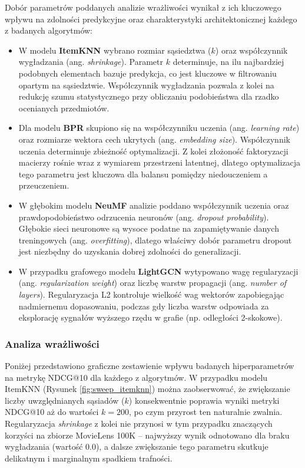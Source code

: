 Dobór parametrów poddanych analizie wrażliwości wynikał z ich kluczowego wpływu na zdolności predykcyjne oraz charakterystyki architektonicznej każdego z badanych algorytmów:
\begin{itemize}
    \item W modelu \textbf{ItemKNN} wybrano rozmiar sąsiedztwa ($k$) oraz współczynnik wygładzania (ang. \foreignlanguage{english}{\textit{shrinkage}}). Parametr $k$ determinuje, na ilu najbardziej podobnych elementach bazuje predykcja, co jest kluczowe w filtrowaniu opartym na sąsiedztwie. Współczynnik wygładzania pozwala z kolei na redukcję szumu statystycznego przy obliczaniu podobieństwa dla rzadko ocenianych przedmiotów.
    \item Dla modelu \textbf{BPR} skupiono się na współczynniku uczenia (ang. \foreignlanguage{english}{\textit{learning rate}}) oraz rozmiarze wektora cech ukrytych (ang. \foreignlanguage{english}{\textit{embedding size}}). Współczynnik uczenia determinuje zbieżność optymalizacji. Z kolei złożoność faktoryzacji macierzy rośnie wraz z wymiarem przestrzeni latentnej, dlatego optymalizacja tego parametru jest kluczowa dla balansu pomiędzy niedouczeniem a przeuczeniem.
    \item W głębokim modelu \textbf{NeuMF} analizie poddano współczynnik uczenia oraz prawdopodobieństwo odrzucenia neuronów (ang. \foreignlanguage{english}{\textit{dropout probability}}). Głębokie sieci neuronowe są wysoce podatne na zapamiętywanie danych treningowych (ang. \foreignlanguage{english}{\textit{overfitting}}), dlatego właściwy dobór parametru dropout jest niezbędny do uzyskania dobrej zdolności do generalizacji.
    \item W przypadku grafowego modelu \textbf{LightGCN} wytypowano wagę regularyzacji (ang. \foreignlanguage{english}{\textit{regularization weight}}) oraz liczbę warstw propagacji (ang. \foreignlanguage{english}{\textit{number of layers}}). Regularyzacja L2 kontroluje wielkość wag wektorów zapobiegając nadmiernemu dopasowaniu, podczas gdy liczba warstw odpowiada za eksplorację sygnałów wyższego rzędu w grafie (np. odległości 2-skokowe).
\end{itemize}

\subsubsection{Analiza wrażliwości}

Poniżej przedstawiono graficzne zestawienie wpływu badanych hiperparametrów na metrykę NDCG@10 dla każdego z algorytmów.
W przypadku modelu ItemKNN (Rysunek \ref{fig:sweep_itemknn}) można zaobserwować, że zwiększanie liczby uwzględnianych sąsiadów ($k$) konsekwentnie poprawia wyniki metryki NDCG@10 aż do wartości $k=200$, po czym przyrost ten naturalnie zwalnia. Regularyzacja \textit{shrinkage} z kolei nie przynosi w tym przypadku znaczących korzyści na zbiorze MovieLens 100K -- najwyższy wynik odnotowano dla braku wygładzania (wartość 0.0), a dalsze zwiększanie tego parametru skutkuje delikatnym i marginalnym spadkiem trafności.

